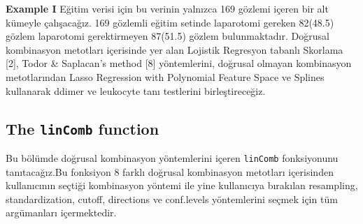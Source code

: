 \documentclass[]{article}
\newcommand{\hlnum}[1]{\textcolor[rgb]{0.816,0.125,0.439}{#1}}%
\newcommand{\hlstr}[1]{\textcolor[rgb]{0.251,0.627,0.251}{#1}}%
\newcommand{\hlcom}[1]{\textcolor[rgb]{0.502,0.502,0.502}{\textit{#1}}}%
\newcommand{\hlstd}[1]{\textcolor[rgb]{0.251,0.251,0.251}{#1}}%
\newenvironment{Shaded}{\begin{myshaded}}{\end{myshaded}}
\newcommand{\DecValTok}[1]{\hlnum{#1}}
\newcommand{\SpecialCharTok}[1]{\hlstr{#1}}
\newcommand{\StringTok}[1]{\hlstr{#1}}
\newcommand{\CommentTok}[1]{\hlcom{#1}}
\newcommand{\OtherTok}[1]{{#1}}
\newcommand{\FunctionTok}[1]{\hlstd{#1}}
\newcommand{\AttributeTok}[1]{{#1}}
\newcommand{\NormalTok}[1]{\hlstd{#1}}
\begin{document}
\textbf{Example I} Eğitim verisi için bu verinin yalnızca 169 gözlemi içeren bir alt kümeyle çalışacağız. 169 gözlemli eğitim setinde laparotomi gereken 82(48.5) gözlem laparotomi gerektirmeyen 87(51.5) gözlem bulunmaktadır. Doğrusal kombinasyon metotları içerisinde yer alan Lojistik Regresyon tabanlı Skorlama {[}2{]}, Todor \& Saplacan's method {[}8{]} yöntemlerini, doğrusal olmayan kombinasyon metotlarından Lasso Regression with Polynomial Feature Space ve Splines kullanarak ddimer ve leukocyte tanı testlerini birleştireceğiz.

\begin{Shaded}
\end{Shaded}

\hypertarget{the-lincomb-function}{%
\subsection{\texorpdfstring{The \texttt{linComb} function}{The linComb function}}\label{the-lincomb-function}}

Bu bölümde doğrusal kombinasyon yöntemlerini içeren \texttt{linComb} fonksiyonunu tanıtacağız.Bu fonksiyon 8 farklı doğrusal kombinasyon metotları içerisinden kullanıcının seçtiği kombinasyon yöntemi ile yine kullanıcıya bırakılan resampling, standardization, cutoff, directions ve conf.levels yöntemlerini seçmek için tüm argümanları içermektedir.
\end{document}
